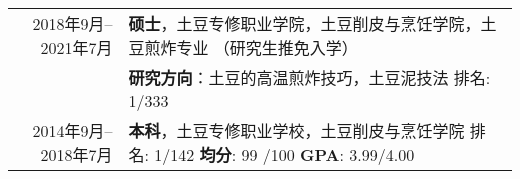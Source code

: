 


\begin{tabular}{rl}	
	\textsc{2018年9月--2021年7月}	&  \textbf{硕士}，土豆专修职业学院，土豆削皮与烹饪学院，土豆煎炸专业  （研究生推免入学）\\
	& \textbf{研究方向}：土豆的高温煎炸技巧，土豆泥技法 \quad \textsc{排名}: 1/333 \\
	\textsc{2014年9月--2018年7月} 	&  \textbf{本科}，土豆专修职业学校，土豆削皮与烹饪学院 \quad \textsc{排名}: 1/142  \textbf{均分}: 99 /100 \textbf{GPA}: 3.99/4.00
\end{tabular}